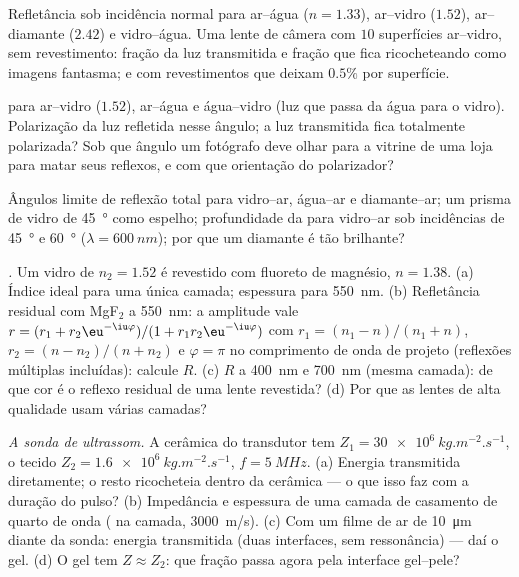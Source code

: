 \begin{exercise}[$\star$]\label{exo:b2:wave-interfaces:2}
Refletância sob incidência normal para ar--água ($n = 1.33$), ar--vidro
($1.52$), ar--diamante ($2.42$) e vidro--água. Uma lente de câmera com $10$
superfícies ar--vidro, sem revestimento: fração da luz transmitida e
fração que fica ricocheteando como imagens fantasma; e com revestimentos que deixam
$0.5\%$ por superfície.
\end{exercise}

\begin{exercise}[$\star$]\label{exo:b2:wave-interfaces:3}
 para ar--vidro ($1.52$), ar--água e água--vidro
(luz que passa da água para o vidro). Polarização da luz refletida
nesse ângulo; a luz transmitida fica totalmente polarizada? Sob que
ângulo um fotógrafo deve olhar para a vitrine de uma loja para matar seus
reflexos, e com que orientação do polarizador?
\end{exercise}

\begin{exercise}[$\star$]\label{exo:b2:wave-interfaces:4}
Ângulos limite de reflexão total para vidro--ar, água--ar e
diamante--ar; um prisma de vidro de \qty{45}{\degree} como espelho; profundidade da
 para vidro--ar sob incidências de \qty{45}{\degree} e \qty{60}{\degree}
($\lambda = \qty{600}{nm}$); por que um diamante é tão brilhante?
\end{exercise}

\begin{exercise}[$\star\star$]\label{exo:b2:wave-interfaces:5}
\emph{.} Um vidro de $n_2 = 1.52$ é revestido com
fluoreto de magnésio, $n = 1.38$. (a) Índice ideal para uma única camada;
espessura para \qty{550}{nm}. (b) Refletância residual com MgF$_2$ a
\qty{550}{nm}: a amplitude vale $r = (r_1 + r_2\eu^{-\iu\varphi})/(1 + r_1r_2
\eu^{-\iu\varphi})$ com $r_1 = (n_1 - n)/(n_1 + n)$, $r_2 = (n - n_2)/(n + n_2)$
e $\varphi = \pi$ no comprimento de onda de projeto (reflexões múltiplas
incluídas): calcule $R$. (c) $R$ a \qty{400}{nm} e \qty{700}{nm} (mesma
camada): de que cor é o reflexo residual de uma lente revestida?
(d) Por que as lentes de alta qualidade usam várias camadas?
\end{exercise}

\begin{exercise}[$\star\star$]\label{exo:b2:wave-interfaces:6}
\emph{A sonda de ultrassom.} A cerâmica do transdutor tem $Z_1 = \qty{30e6}{kg.m^{-2}.s^{-1}}$,
o tecido $Z_2 = \qty{1.6e6}{kg.m^{-2}.s^{-1}}$, $f = \qty{5}{MHz}$. (a) Energia
transmitida diretamente; o resto ricocheteia dentro da cerâmica --- o que
isso faz com a duração do pulso? (b) Impedância e espessura de uma
camada de casamento de quarto de onda ( na camada, \qty{3000}{m/s}).
(c) Com um filme de ar de \qty{10}{\micro m} diante da sonda: energia
transmitida (duas interfaces, sem ressonância) --- daí o gel. (d) O
gel tem $Z \approx Z_2$: que fração passa agora pela interface gel--pele?
\end{exercise}

